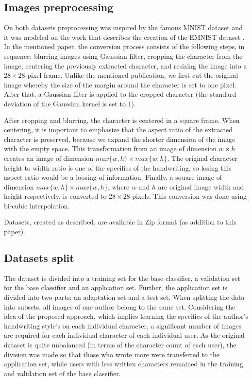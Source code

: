 \documentclass{article}
\begin{document}
\subsection{Images preprocessing}

On both datasets preprocessing was inspired by the famous MNIST dataset \citet{mnist} and it was modeled on the work that describes the creation of the EMNIST dataset \citet{emnist}.
In the mentioned paper, the conversion process consists of the following steps, in sequence:
blurring images using Gaussian filter, cropping the character from the image, centering the previously extracted character, and resizing the image into a $28 \times 28$ pixel frame.
Unlike the mentioned publication, we first cut the original image whereby the size of the margin around the character is set to one pixel.
After that, a Gaussian filter is applied to the cropped character (the standard deviation of the Gaussian kernel is set to $1$).

After cropping and blurring, the character is centered in a square frame.
When centering, it is important to emphasize that the aspect ratio of the extracted character is preserved, because we expand the shorter dimension of the image with the empty space.
This transformation from an image of dimension $w\times h$ creates an image of dimension $max\{w, h\}\times max\{w, h\}$.
The original character height to width ratio is one of the specifics of the handwriting, so losing this aspect ratio would be a loosing of information.
Finally, a square image of dimension $max\{w, h\}\times max\{w, h\}$,
where $w$ and $h$ are original image width and height respectively, is converted to $28 \times 28$ pixels.
This conversion was done using bi-cubic interpolation.

Datasets, created as described, are available in Zip format (as addition to this paper).

\subsection{Datasets split}

The dataset is divided into a training set for the base classifier, a validation set for the base classifier and an application set.
Further, the application set is divided into two parts: an adaptation set and a test set.
When splitting the data into subsets, all images of one author belong to the same set.
Considering the idea of the proposed approach, which implies learning the specifics of the author's handwriting style's on each individual character,
a significant number of images are required for each individual character of each individual user.
As the original dataset is quite unbalanced (in terms of the character count of each user), the division was made so that those who wrote more were transferred to the application set,
while users with less written characters remained in the training and validation set of the base classifier.
\end{document}
